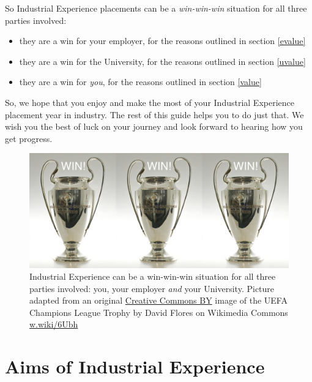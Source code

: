 \documentclass[
]{book}
\providecommand{\tightlist}{%
  \setlength{\itemsep}{0pt}\setlength{\parskip}{0pt}}
\begin{document}
So Industrial Experience placements can be a \emph{win-win-win} situation for all three parties involved:

\begin{itemize}
\tightlist
\item
  they are a win for your employer, for the reasons outlined in section \ref{evalue}
\item
  they are a win for the University, for the reasons outlined in section \ref{uvalue}
\item
  they are a win for \emph{you}, for the reasons outlined in section \ref{value}
\end{itemize}

So, we hope that you enjoy and make the most of your Industrial Experience placement year in industry. The rest of this guide helps you to do just that. We wish you the best of luck on your journey and look forward to hearing how you get progress.

\begin{figure}

{\centering \includegraphics[width=1\linewidth]{images/winwinwin} 

}

\caption{Industrial Experience can be a win-win-win situation for all three parties involved: you, your employer \emph{and} your University. Picture adapted from an original \href{https://creativecommons.org/licenses/by/2.0/deed.en}{Creative Commons BY} image of the UEFA Champions League Trophy by David Flores on Wikimedia Commons \href{https://w.wiki/6Ubh}{w.wiki/6Ubh}}\label{fig:winwinwin-fig}
\end{figure}



\chapter{Aims of Industrial Experience}\label{aims}
\end{document}

